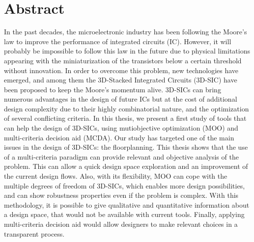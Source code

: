 \chapter{Abstract}

In the past decades, the microelectronic industry has been following the Moore's law to improve the performance of integrated circuits (IC). However, it will probably be impossible to follow this law in the future due to physical limitations appearing with the miniaturization of the transistors below a certain threshold without innovation. In order to overcome this problem, new technologies have emerged, and among them the 3D-Stacked Integrated Circuits (3D-SIC) have been proposed to keep the Moore's momentum alive. 3D-SICs can bring numerous advantages in the design of future ICs but at the cost of additional design complexity due to their highly combinatorial nature, and the optimization of several conflicting criteria. In this thesis, we present a first study of tools that can help the design of 3D-SICs, using mutiobjective optimization (MOO) and multi-criteria decision aid (MCDA). Our study has targeted one of the main issues in the design of 3D-SICs: the floorplanning. This thesis shows that the use of a multi-criteria paradigm can provide relevant and objective analysis of the problem. This can allow a quick design space exploration and an improvement of the current design flows. Also, with its flexibility, MOO can cope with the multiple degrees of freedom of 3D-SICs, which enables more design possibilities, and can show robustness properties even if the problem is complex. With this methodology, it is possible to give qualitative and quantitative information about a design space, that would not be available with current tools. Finally, applying multi-criteria decision aid would allow designers to make relevant choices in a transparent process.